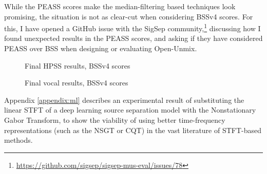 \documentclass[letter,12pt]{article}
\begin{document}
While the PEASS scores make the median-filtering based techniques look promising, the situation is not as clear-cut when considering BSSv4 scores. For this, I have opened a GitHub issue with the SigSep community,\footnote{\url{https://github.com/sigsep/sigsep-mus-eval/issues/78}} discussing how I found unexpected results in the PEASS scores, and asking if they have considered PEASS over BSS when designing or evaluating Open-Unmix.

\begin{figure}[ht]
	\centering
	\caption{Final HPSS results, BSSv4 scores}
	\label{fig:bssv4hpss}
	\vspace{1em}
	\caption{Final vocal results, BSSv4 scores}
	\label{fig:bssv4vocal}
\end{figure}

Appendix \ref{appendix:ml} describes an experimental result of substituting the linear STFT of a deep learning source separation model with the Nonstationary Gabor Transform, to show the viability of using better time-frequency representations (such as the NSGT or CQT) in the vast literature of STFT-based methods.
\end{document}
